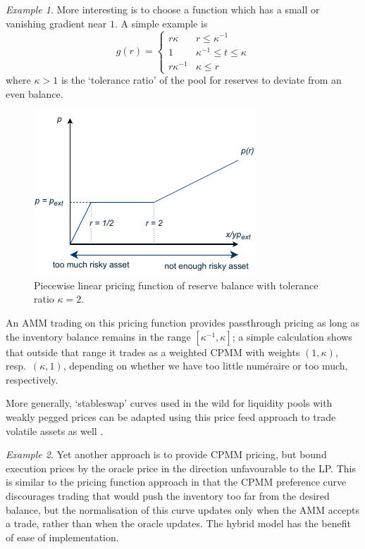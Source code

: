 \documentclass[a4paper,10pt]{article}
\theoremstyle{remark}
\newtheorem*{example}{Example}
\begin{document}
\begin{example}
  More interesting is to choose a function which has a small or vanishing gradient near $1$. A simple example is
  \[
    g(r) = \left\{\begin{array}{ll}
      r\kappa & r \leq \kappa^{-1} \\
      1           & \kappa^{-1} \leq t \leq \kappa \\
      r\kappa^{-1} & \kappa\leq r
    \end{array}\right.
  \]
  where $\kappa >1$ is the `tolerance ratio' of the pool for reserves to deviate from an even balance.
  \begin{figure}
    \begin{center} 
      \includegraphics{diagrams/price-curve.pdf}
      \caption{Piecewise linear pricing function of reserve balance with tolerance ratio $\kappa = 2$.}
    \end{center}
  \end{figure}
  An AMM trading on this pricing function provides passthrough pricing as long as the inventory balance remains in the range $[\kappa^{-1},\kappa]$; a simple calculation shows that outside that range it trades as a weighted CPMM with weights $(1,\kappa)$, resp.~$(\kappa,1)$, depending on whether we have too little num\'eraire or too much, respectively.
  
  More generally, `stableswap' curves used in the wild for liquidity pools with weakly pegged prices can be adapted using this price feed approach to trade volatile assets as well \cite{egorov2019stableswap, port2022mixing}.

\end{example}

\begin{example}

  Yet another approach is to provide CPMM pricing, but bound execution prices by the oracle price in the direction unfavourable to the LP.
  This is similar to the pricing function approach in that the CPMM preference curve discourages trading that would push the inventory too far from the desired balance, but the normalisation of this curve updates only when the AMM accepts a trade, rather than when the oracle updates.
  The hybrid model has the benefit of ease of implementation.
  
\end{example}
\end{document}
